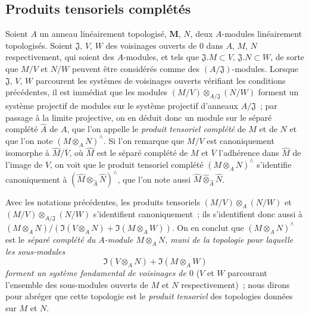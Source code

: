\subsection{Produits tensoriels complétés}
\label{subsection:0.7.7-fr}

\begin{env}[7.7.1]
\label{0.7.7.1-fr}
Soient $A$ un anneau linéairement topologisé, $\mathbf{M}$, $N$, deux $A$-modules
linéairement topologisés. Soient $\mathfrak J$, $V$, $W$ des voisinages
ouverts de $0$ dans $A$, $M$, $N$ respectivement, qui soient des
$A$-modules, et tels que $\mathfrak J.M\subset V$, $\mathfrak J.N\subset W$,
de sorte que $M/V$ et $N/W$ peuvent être considérés comme des
$(A/\mathfrak J)$-modules. Lorsque $\mathfrak J$, $V$, $W$ parcourent les
systèmes de voisinages ouverts vérifiant les conditions précédentes, il est
immédiat que les modules
$(M/V)\otimes_{A/\mathfrak J}(N/W)$ forment un système projectif de modules
sur le système projectif d'anneaux $A/\mathfrak J$~; par passage à la limite
projective, on en déduit donc un module sur le séparé complété $\widehat A$
de $A$, que l'on appelle le \emph{produit tensoriel complété} de $M$ et de
$N$ et que l'on note $(M\otimes_A N)^\wedge$. Si l'on remarque que $M/V$
est canoniquement isomorphe à $\widehat M/\overline V$, où $\widehat M$ est
le séparé complété de $M$ et $\overline V$ l'adhérence dans $\widehat M$ de
l'image de $V$, on voit que le produit tensoriel complété
$(M\otimes_A N)^\wedge$ s'identifie canoniquement à
$(\widehat M\otimes_{\widehat A}\widehat N)^\wedge$, que l'on note aussi
$\widehat M\widehat\otimes_{\widehat A}\widehat N$.
\end{env}

\begin{env}[7.7.2]
\label{0.7.7.2-fr}
\begin{sloppypar}
Avec les notations précédentes, les produits tensoriels
$(M/V)\otimes_A(N/W)$ et
$(M/V)\otimes_{A/\mathfrak J}(N/W)$ s'identifient canoniquement~; ils
s'identifient donc aussi à
$(M\otimes_A N)/(\Im(V\otimes_A N)+\Im(M\otimes_A W))$.
On en conclut que $(M\otimes_A N)^\wedge$ est le \emph{séparé complété du
$A$-module $M\otimes_A N$, muni de la topologie pour laquelle les
sous-modules}
\[
  \Im(V\otimes_A N)+\Im(M\otimes_A W)
\]
\emph{forment un système fondamental de voisinages de $0$} ($V$ et $W$
parcourant l'ensemble des sous-modules ouverts de $M$ et $N$
respectivement)~; nous dirons pour abréger que cette topologie est le
\emph{produit tensoriel} des topologies données sur $M$ et $N$.
\end{sloppypar}
\end{env}

